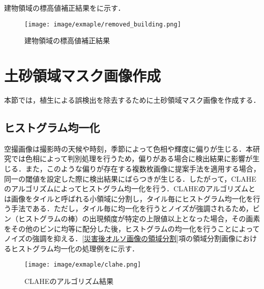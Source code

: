       建物領域の標高値補正結果をに示す．

      \begin{figure}[tbp]
        \centering
        \texttt{[image: image/exmaple/removed\_building.png]}
        \caption{建物領域の標高値補正結果}
        \label{建物領域の標高値補正結果}
      \end{figure}



  \section{土砂領域マスク画像作成}
    \label{土砂領域マスク画像作成}
    本節では，植生による誤検出を除去するために土砂領域マスク画像を作成する．


    \subsection{ヒストグラム均一化}
      空撮画像は撮影時の天候や時刻，季節によって色相や輝度に偏りが生じる．本研究では色相によって判別処理を行うため，偏りがある場合に検出結果に影響が生じる．また，このような偏りが存在する複数枚画像に提案手法を適用する場合，同一の閾値を設定した際に検出結果にばらつきが生じる．したがって，CLAHEのアルゴリズム\cite{CLAHEのアルゴリズム}によってヒストグラム均一化を行う．CLAHEのアルゴリズムとは画像をタイルと呼ばれる小領域に分割し，タイル毎にヒストグラム均一化を行う手法である．ただし，タイル毎に均一化を行うとノイズが強調されるため，ビン（ヒストグラムの棒）の出現頻度が特定の上限値以上となった場合，その画素をその他のビンに均等に配分した後，ヒストグラムの均一化を行うことによってノイズの強調を抑える．\ref{災害後オルソ画像の領域分割}項の領域分割画像におけるヒストグラム均一化の処理例をに示す．

      \begin{figure}[tbp]
        \centering
        \texttt{[image: image/exmaple/clahe.png]}
        \caption{CLAHEのアルゴリズム結果}
        \label{CLAHEのアルゴリズム結果}
      \end{figure}


